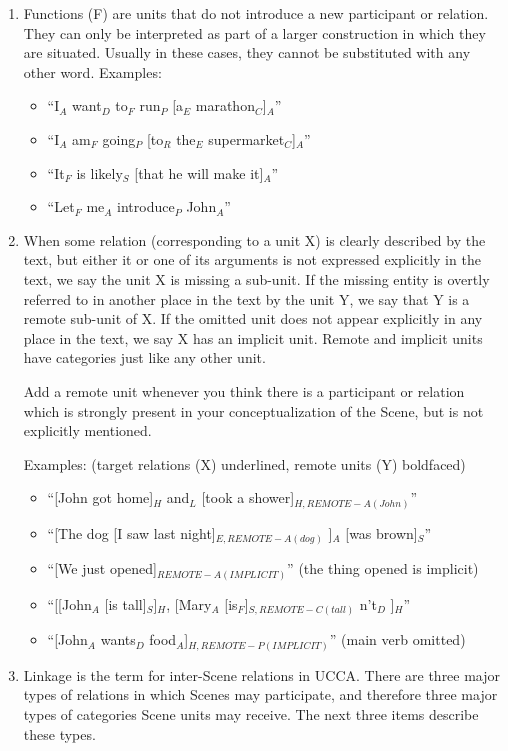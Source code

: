\documentclass[11pt]{article}
\begin{document}
\begin{enumerate}
\item
Functions (F) are units that do not introduce a new participant or relation. They can only be interpreted as part of a larger construction in which they are situated. Usually in these cases, they cannot be substituted with any other word.
Examples:
\begin{itemize}
\item
``I$_A$ want$_D$ to$_F$ run$_P$ [a$_E$ marathon$_C$]$_A$''
\item
``I$_A$ am$_F$ going$_P$ [to$_R$ the$_E$ supermarket$_C$]$_A$''
\item
``It$_F$ is likely$_S$ [that he will make it]$_A$''
\item
``Let$_F$ me$_A$ introduce$_P$ John$_A$''
\end{itemize}

\item
When some relation (corresponding to a unit X) is clearly described by the text, but either it or one of its arguments is not expressed explicitly in the text, we say the unit X is missing a sub-unit. If the missing entity is overtly referred to in another place in the text by the unit Y, we say that Y is a remote sub-unit of X. If the omitted unit does not appear explicitly in any place in the text, we say X has an implicit unit. Remote and implicit units have categories just like any other unit.

Add a remote unit whenever you think there is a participant or relation which is strongly present in your conceptualization of the Scene, but is not explicitly mentioned.

Examples: (target relations (X) underlined, remote units (Y) boldfaced)

\begin{itemize}
\item	``[John got home]$_H$ and$_L$ [took a shower]$_{H,REMOTE-A(John)}$''
\item	``[The dog [I saw last night]$_{E,REMOTE-A(dog)}$ ]$_A$ [was brown]$_S$''
\item 	``[We just opened]$_{REMOTE-A(IMPLICIT)}$'' (the thing opened is implicit)
\item   ``[[John$_A$ [is tall]$_S$]$_H$, [Mary$_A$ [is$_F$]$_{S,REMOTE-C(tall)}$ n't$_D$ ]$_H$''
\item	``[John$_A$ wants$_D$ food$_A$]$_{H,REMOTE-P(IMPLICIT)}$'' (main verb omitted)
\end{itemize}

\item
Linkage is the term for inter-Scene relations in UCCA. There are three major
types of relations in which Scenes may participate, and therefore three major types of categories Scene units may receive. The next three items describe these types.


\end{enumerate}
\end{document}
